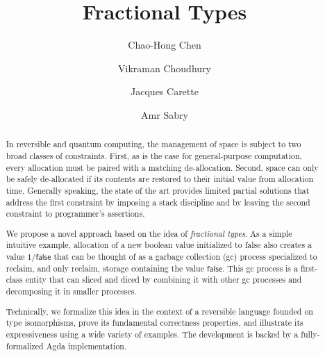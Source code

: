 \documentclass[sigplan,10pt,review,anonymous]{acmart}
\newcommand{\oneover}[1]{1/#1}
\begin{document}
\title{Fractional Types}
\author{Chao-Hong Chen}

\author{Vikraman Choudhury}

\author{Jacques Carette}

\author{Amr Sabry}

\begin{abstract}
  In reversible and quantum computing, the management of space is
  subject to two broad classes of constraints. First, as is the case
  for general-purpose computation, every allocation must be paired
  with a matching de-allocation. Second, space can only be safely
  de-allocated if its contents are restored to their initial value
  from allocation time. Generally speaking, the state of the art
  provides limited partial solutions that address the first
  constraint by imposing a stack discipline and by leaving the second
  constraint to programmer's assertions.

  We propose a novel approach based on the idea of \emph{fractional
    types}. As a simple intuitive example, allocation of a new boolean
  value initialized to \textsf{false} also creates a value
  $\oneover{\textsf{false}}$ that can be thought of as a garbage
  collection (gc) process specialized to reclaim, and only reclaim,
  storage containing the value $\textsf{false}$. This gc process is a
  first-class entity that can sliced and diced by combining it with
  other gc processes and decomposing it in smaller
  processes.

  Technically, we formalize this idea in the context of a reversible
  language founded on type isomorphisms, prove its fundamental
  correctness properties, and illustrate its expressiveness using a
  wide variety of examples. The development is backed by a
  fully-formalized Agda implementation.
\end{abstract}

\maketitle









\end{document}
